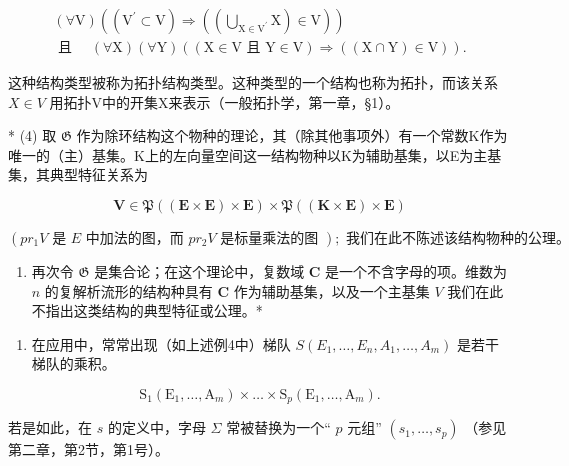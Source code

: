 \[
\begin{array}{l} (\forall \mathrm{V}) ((\mathrm{V} ^ {\prime} \subset \mathrm{V}) \Longrightarrow ((\bigcup_ {\mathrm{X} \in \mathrm{V} ^ {\prime}} \mathrm{X}) \in \mathrm{V})) \\ \text { 且 } \quad (\forall \mathrm{X}) (\forall \mathrm{Y}) ((\mathrm{X} \in \mathrm{V} \text {   且   } \mathrm{Y} \in \mathrm{V}) \Longrightarrow ((\mathrm{X} \cap \mathrm{Y}) \in \mathrm{V})). \end{array}
\]

这种结构类型被称为拓扑结构类型。这种类型的一个结构也称为拓扑，而该关系 \(X \in V\) 用拓扑V中的开集X来表示（一般拓扑学，第一章，§1）。

* (4) 取 \(\mathfrak{G}\) 作为除环结构这个物种的理论，其（除其他事项外）有一个常数K作为唯一的（主）基集。K上的左向量空间这一结构物种以K为辅助基集，以E为主基集，其典型特征关系为

\[
\mathbf {V} \in \mathfrak {P} ((\mathbf {E} \times \mathbf {E}) \times \mathbf {E}) \times \mathfrak {P} ((\mathbf {K} \times \mathbf {E}) \times \mathbf {E})
\]

\((pr_{1}V \text{ 是 } E \text{ 中加法的图，而 } pr_{2}V \text{ 是标量乘法的图 }); \text{ 我们在此不陈述该结构物种的公理。}\)

\begin{enumerate}
\def\labelenumi{(\arabic{enumi})}
\setcounter{enumi}{4}
\tightlist
\item
  再次令 \(\mathfrak{G}\) 是集合论；在这个理论中，复数域 \(\mathbf{C}\) 是一个不含字母的项。维数为 \(n\) 的复解析流形的结构种具有 \(\mathbf{C}\) 作为辅助基集，以及一个主基集 \(V\) 我们在此不指出这类结构的典型特征或公理。*
\end{enumerate}


\begin{enumerate}
\def\labelenumi{(\arabic{enumi})}
\tightlist
\item
  在应用中，常常出现（如上述例4中）梯队 \(S(E_1, \ldots, E_n, A_1, \ldots, A_m)\) 是若干梯队的乘积。
\end{enumerate}

\[
\mathrm{S} _ {1} \left(\mathrm{E} _ {1}, \dots , \mathrm{A} _ {m}\right) \times \dots \times \mathrm{S} _ {p} \left(\mathrm{E} _ {1}, \dots , \mathrm{A} _ {m}\right).
\]

若是如此，在 \(s\) 的定义中，字母 \(\Sigma\) 常被替换为一个“ \(p\) 元组” \((s_{1}, \ldots, s_{p})\) （参见第二章，第2节，第1号）。

